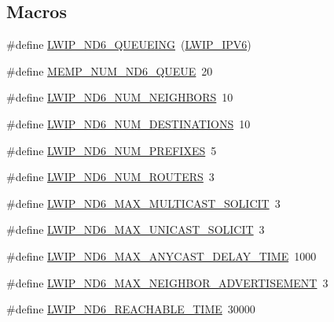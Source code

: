 \subsection*{Macros}
\begin{DoxyCompactItemize}
\item 
\#define \hyperlink{group__lwip__opts__nd6_ga0757a3c1b5d1563ad2d77228e1d8a60f}{L\+W\+I\+P\+\_\+\+N\+D6\+\_\+\+Q\+U\+E\+U\+E\+I\+NG}~(\hyperlink{openmote-cc2538_2lwip_2test_2fuzz_2lwipopts_8h_a872e3bb3fe2212156d66b18fccc9643f}{L\+W\+I\+P\+\_\+\+I\+P\+V6})
\item 
\#define \hyperlink{group__lwip__opts__nd6_gabfaf3d92d51e2a9d70c8360af2611fb2}{M\+E\+M\+P\+\_\+\+N\+U\+M\+\_\+\+N\+D6\+\_\+\+Q\+U\+E\+UE}~20
\item 
\#define \hyperlink{group__lwip__opts__nd6_gab2fe15bdb4e0a41f295eb5577b11ad16}{L\+W\+I\+P\+\_\+\+N\+D6\+\_\+\+N\+U\+M\+\_\+\+N\+E\+I\+G\+H\+B\+O\+RS}~10
\item 
\#define \hyperlink{group__lwip__opts__nd6_gacad118b1ae886e80137a1d4f0fb19672}{L\+W\+I\+P\+\_\+\+N\+D6\+\_\+\+N\+U\+M\+\_\+\+D\+E\+S\+T\+I\+N\+A\+T\+I\+O\+NS}~10
\item 
\#define \hyperlink{group__lwip__opts__nd6_gad9cc576b5951f1b5e1c2b0d0bb831d9a}{L\+W\+I\+P\+\_\+\+N\+D6\+\_\+\+N\+U\+M\+\_\+\+P\+R\+E\+F\+I\+X\+ES}~5
\item 
\#define \hyperlink{group__lwip__opts__nd6_ga75e81a96148f266c8fad8c0bcab2f36a}{L\+W\+I\+P\+\_\+\+N\+D6\+\_\+\+N\+U\+M\+\_\+\+R\+O\+U\+T\+E\+RS}~3
\item 
\#define \hyperlink{group__lwip__opts__nd6_ga980909018aed54adc10dd68be3572b30}{L\+W\+I\+P\+\_\+\+N\+D6\+\_\+\+M\+A\+X\+\_\+\+M\+U\+L\+T\+I\+C\+A\+S\+T\+\_\+\+S\+O\+L\+I\+C\+IT}~3
\item 
\#define \hyperlink{group__lwip__opts__nd6_gafa6f4c2d2c259ab0895fa03a6f08c691}{L\+W\+I\+P\+\_\+\+N\+D6\+\_\+\+M\+A\+X\+\_\+\+U\+N\+I\+C\+A\+S\+T\+\_\+\+S\+O\+L\+I\+C\+IT}~3
\item 
\#define \hyperlink{group__lwip__opts__nd6_ga960b8973df083fad53ae0eaa79f8c4df}{L\+W\+I\+P\+\_\+\+N\+D6\+\_\+\+M\+A\+X\+\_\+\+A\+N\+Y\+C\+A\+S\+T\+\_\+\+D\+E\+L\+A\+Y\+\_\+\+T\+I\+ME}~1000
\item 
\#define \hyperlink{group__lwip__opts__nd6_ga86ab0cac87cdc7aeff09384ddbaaba2a}{L\+W\+I\+P\+\_\+\+N\+D6\+\_\+\+M\+A\+X\+\_\+\+N\+E\+I\+G\+H\+B\+O\+R\+\_\+\+A\+D\+V\+E\+R\+T\+I\+S\+E\+M\+E\+NT}~3
\item 
\#define \hyperlink{group__lwip__opts__nd6_ga269db9d61cdfc2fd3bc7b12c56261c74}{L\+W\+I\+P\+\_\+\+N\+D6\+\_\+\+R\+E\+A\+C\+H\+A\+B\+L\+E\+\_\+\+T\+I\+ME}~30000

\end{DoxyCompactItemize}

